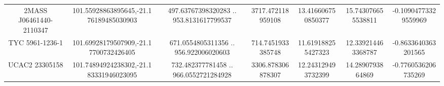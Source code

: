 \begin{table}
\begin{tabular}{ccccccc}
2MASS J06461440-2110347 & 101.55928863895645,-21.176189485030903 & 497.63767398320283 .. 953.8131617799537 & 3717.472118959108 & 13.416606750850377 & 15.743076655538811 & -0.10904773329559969 \\
TYC 5961-1236-1 & 101.69928179507909,-21.17700732426405 & 671.0554805311356 .. 956.922006020603 & 714.7451933385748 & 11.619188255427323 & 12.339214463368787 & -0.8633640363201565 \\
UCAC2  23305158 & 101.74894924238302,-21.183331946023095 & 732.482377781458 .. 966.0552721284928 & 3306.878306878307 & 12.243129493732399 & 14.2890793864869 & -0.7760536206735269 \\
\end{tabular}
\end{table}
